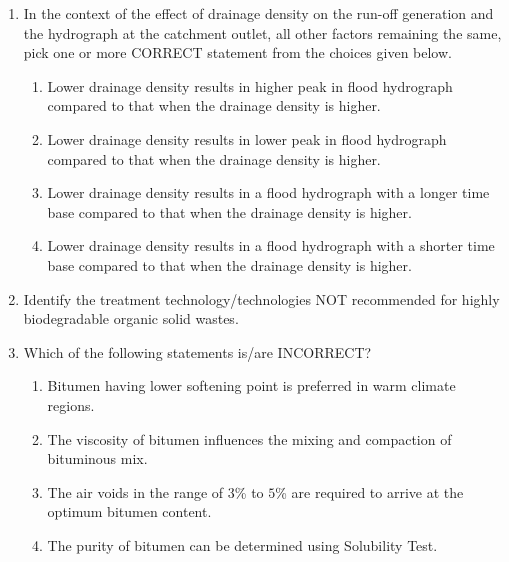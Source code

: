 \documentclass[journal,12pt,onecolumn]{article}
\theoremstyle{remark}
\begin{document}
\begin{enumerate}
    \item In the context of the effect of drainage density on the run-off generation and the hydrograph at the catchment outlet, all other factors remaining the same, pick one or more CORRECT statement from the choices given below.

    \hfill{}
    \begin{enumerate}
        \item Lower drainage density results in higher peak in flood hydrograph compared to that when the drainage density is higher.
        \item Lower drainage density results in lower peak in flood hydrograph compared to that when the drainage density is higher.
        \item Lower drainage density results in a flood hydrograph with a longer time base compared to that when the drainage density is higher.
        \item Lower drainage density results in a flood hydrograph with a shorter time base compared to that when the drainage density is higher.
    \end{enumerate}

    \item Identify the treatment technology/technologies NOT recommended for highly biodegradable organic solid wastes.

    \hfill{}
    \begin{enumerate}
    \end{enumerate}

    \item Which of the following statements is/are INCORRECT?

    \hfill{}
    \begin{enumerate}
        \item Bitumen having lower softening point is preferred in warm climate regions.
        \item The viscosity of bitumen influences the mixing and compaction of bituminous mix.
        \item The air voids in the range of $3$\% to $5$\% are required to arrive at the optimum bitumen content.
        \item The purity of bitumen can be determined using Solubility Test.
    \end{enumerate}


\end{enumerate}
\end{document}
